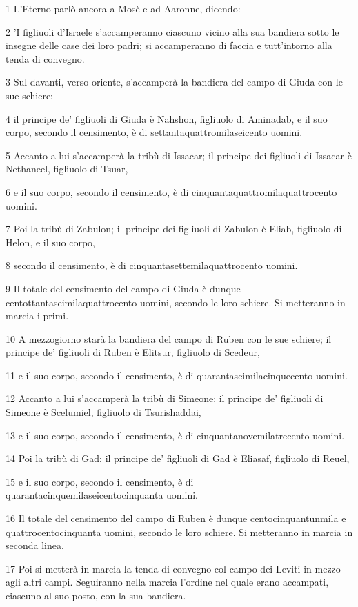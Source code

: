 \par 1 L'Eterno parlò ancora a Mosè e ad Aaronne, dicendo:
\par 2 'I figliuoli d'Israele s'accamperanno ciascuno vicino alla sua bandiera sotto le insegne delle case dei loro padri; si accamperanno di faccia e tutt'intorno alla tenda di convegno.
\par 3 Sul davanti, verso oriente, s'accamperà la bandiera del campo di Giuda con le sue schiere:
\par 4 il principe de' figliuoli di Giuda è Nahshon, figliuolo di Aminadab, e il suo corpo, secondo il censimento, è di settantaquattromilaseicento uomini.
\par 5 Accanto a lui s'accamperà la tribù di Issacar; il principe dei figliuoli di Issacar è Nethaneel, figliuolo di Tsuar,
\par 6 e il suo corpo, secondo il censimento, è di cinquantaquattromilaquattrocento uomini.
\par 7 Poi la tribù di Zabulon; il principe dei figliuoli di Zabulon è Eliab, figliuolo di Helon, e il suo corpo,
\par 8 secondo il censimento, è di cinquantasettemilaquattrocento uomini.
\par 9 Il totale del censimento del campo di Giuda è dunque centottantaseimilaquattrocento uomini, secondo le loro schiere. Si metteranno in marcia i primi.
\par 10 A mezzogiorno starà la bandiera del campo di Ruben con le sue schiere; il principe de' figliuoli di Ruben è Elitsur, figliuolo di Scedeur,
\par 11 e il suo corpo, secondo il censimento, è di quarantaseimilacinquecento uomini.
\par 12 Accanto a lui s'accamperà la tribù di Simeone; il principe de' figliuoli di Simeone è Scelumiel, figliuolo di Tsurishaddai,
\par 13 e il suo corpo, secondo il censimento, è di cinquantanovemilatrecento uomini.
\par 14 Poi la tribù di Gad; il principe de' figliuoli di Gad è Eliasaf, figliuolo di Reuel,
\par 15 e il suo corpo, secondo il censimento, è di quarantacinquemilaseicentocinquanta uomini.
\par 16 Il totale del censimento del campo di Ruben è dunque centocinquantunmila e quattrocentocinquanta uomini, secondo le loro schiere. Si metteranno in marcia in seconda linea.
\par 17 Poi si metterà in marcia la tenda di convegno col campo dei Leviti in mezzo agli altri campi. Seguiranno nella marcia l'ordine nel quale erano accampati, ciascuno al suo posto, con la sua bandiera.
